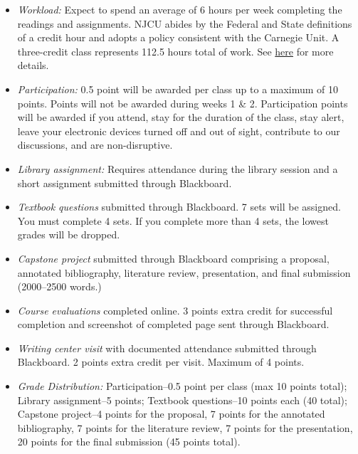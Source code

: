\documentclass[article,oneside]{memoir}
\begin{document}
\begin{itemize}
\item \textit{Workload:} Expect to spend an average of 6 hours per week completing the readings and assignments. NJCU abides by the Federal and State definitions of a credit hour and adopts a policy consistent with the Carnegie Unit. A three-credit class represents 112.5 hours total of work. See \href{http://scottoconnor.org/resources/Credit.pdf}{here} for more details.


\item \textit{Participation:}  0.5 point will be awarded per class up to a maximum of 10 points. Points will not be awarded during weeks 1 \& 2. Participation points will be awarded if you attend, stay for the duration of the class, stay alert, leave your electronic devices turned off and out of sight, contribute to our discussions, and are non-disruptive. 

\item \textit{Library assignment:} Requires attendance during the library session and a short assignment submitted through Blackboard.

\item \textit{Textbook questions} submitted through Blackboard. 7 sets will be assigned. You must complete 4 sets. If you complete more than 4 sets, the lowest grades will be dropped. 




 
\item \textit{Capstone project} submitted through Blackboard comprising a proposal, annotated bibliography, literature review, presentation, and final submission (2000--2500 words.)



\item \textit{Course evaluations} completed online. 3 points extra credit for successful completion and screenshot of completed page sent through Blackboard. 

\item \textit{Writing center visit} with documented attendance submitted through Blackboard. 2 points extra credit per visit. Maximum of 4 points.  


\item \textit{Grade Distribution:}  Participation--0.5 point per class (max 10 points total); Library assignment--5 points; Textbook questions--10 points each (40 total); Capstone project--4 points for the proposal, 7 points for the annotated bibliography, 7 points for the literature review, 7 points for the presentation, 20 points for the final submission (45 points total).


\end{itemize}
\end{document}

